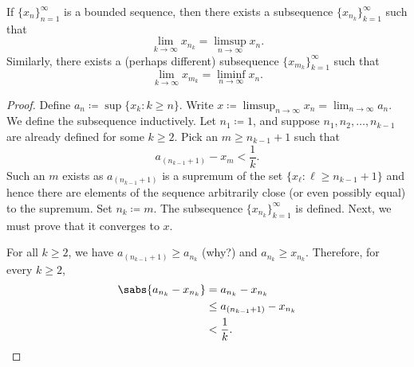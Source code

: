 \begin{thm} \label{subseqlimsupinf:thm}
If $\{ x_n \}_{n=1}^\infty$ is a bounded sequence, then there exists a subsequence
$\{ x_{n_k} \}_{k=1}^\infty$ such that
\begin{equation*}
\lim_{k\to \infty} x_{n_k} = \limsup_{n \to \infty} x_n .
\end{equation*}
Similarly, there exists a (perhaps different) subsequence
$\{ x_{m_k} \}_{k=1}^\infty$ such that
\begin{equation*}
\lim_{k\to \infty} x_{m_k} = \liminf_{n \to \infty} x_n .
\end{equation*}
\end{thm}

\begin{proof}
Define $a_n \coloneqq \sup \{ x_k : k \geq n \}$.
Write
$x \coloneqq \limsup_{n\to\infty} x_n = \lim_{n\to\infty} a_n$.
We define the subsequence inductively.
Let $n_1 \coloneqq 1$, and suppose $n_1,n_2,\ldots,n_{k-1}$ are already defined for
some $k \geq 2$.  Pick an $m \geq n_{k-1} + 1$
such that
\begin{equation*}
a_{(n_{k-1}+1)} - x_m < \frac{1}{k} .
\end{equation*}
Such an $m$ exists
as $a_{(n_{k-1}+1)}$ is a supremum of the
set $\{ x_\ell : \ell \geq n_{k-1} + 1 \}$ and hence there are elements
of the sequence arbitrarily close (or even possibly equal) to the supremum.
Set $n_{k} \coloneqq  m$.  The subsequence $\{ x_{n_k} \}_{k=1}^\infty$ is defined.  Next, we
must prove that it converges to $x$.

For all $k \geq 2$, we have
$a_{(n_{k-1}+1)} \geq a_{n_k}$ (why?) and $a_{n_{k}} \geq x_{n_k}$.
Therefore, for every $k \geq 2$,
\begin{equation*}
\begin{split}
\sabs{a_{n_k} - x_{n_k}} & = 
a_{n_k} - x_{n_k}
\\
& \leq
a_{(n_{k-1}+1)} - x_{n_k}
\\
& < \frac{1}{k} .
\end{split}
\end{equation*}


\end{proof}
